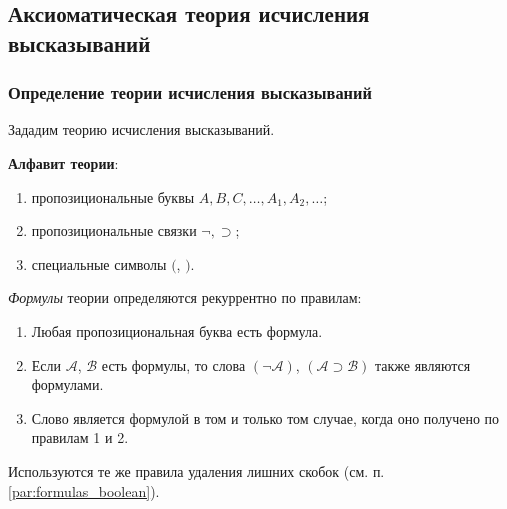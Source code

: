 \subsection{Аксиоматическая теория исчисления высказываний}
\subsubsection{Определение теории исчисления высказываний}
Зададим теорию исчисления высказываний.

\textbf{Алфавит теории}:
\begin{enumerate}
    \item пропозициональные буквы $A, B, C, \dots, A_1, A_2, \dots$;
    \item пропозициональные связки $\neg, \supset$;
    \item специальные символы $($, $)$.
\end{enumerate}
\textit{Формулы} теории определяются рекуррентно по правилам:
\begin{enumerate}
    \item Любая пропозициональная буква есть формула.
    \item Если $\mathcal{A}$, $\mathcal{B}$ есть формулы, то слова $(\neg\mathcal{A})$, $(\mathcal{A} \supset \mathcal{B})$ также являются формулами.
    \item Слово является формулой в том и только том случае, когда оно получено по правилам 1 и 2. 
\end{enumerate}
Используются те же правила удаления лишних скобок (см. п. \ref{par:formulas_boolean}).

